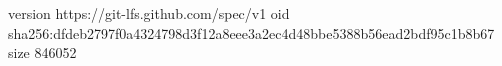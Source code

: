 version https://git-lfs.github.com/spec/v1
oid sha256:dfdeb2797f0a4324798d3f12a8eee3a2ec4d48bbe5388b56ead2bdf95c1b8b67
size 846052
